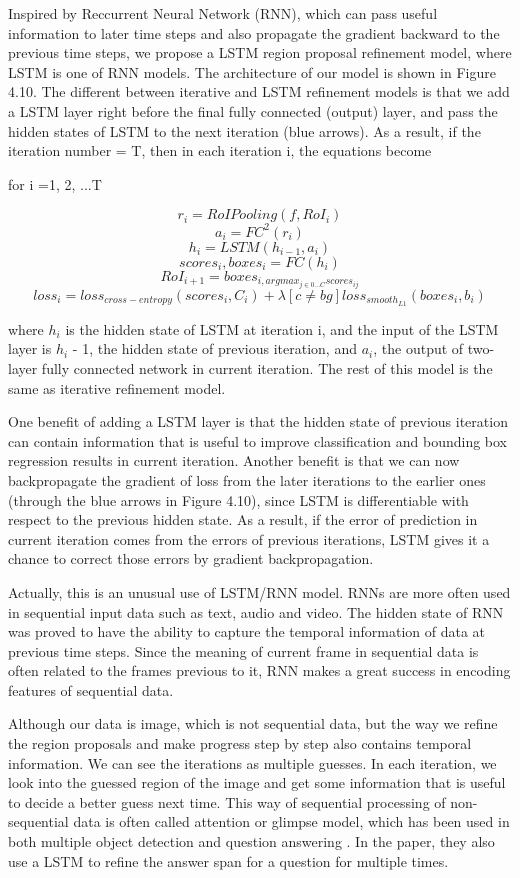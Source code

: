 Inspired by Reccurrent Neural Network (RNN), which
can pass useful information to later time steps and also
propagate the gradient backward to the previous time steps,
we propose a LSTM region proposal refinement model,
where LSTM is one of RNN models. The architecture of
our model is shown in Figure 4.10. The different between iterative and LSTM refinement models is that we add a LSTM
layer right before the final fully connected (output) layer,
and pass the hidden states of LSTM to the next iteration
(blue arrows). As a result, if the iteration number = T, then
in each iteration i, the equations become

for i =1, 2, ...T

\[  r_{i} = RoIPooling(f,RoI_{i})\]
\[a_{i} = FC^{2} (r_{i})\]
\[h_{i} = LSTM(h_{i-1} , a_{i})\]
\[scores_{i} , boxes_{i} = FC(h_{i})\]
\[RoI_{i+1} = boxes_{i , arg  max_{j \in 0... C}scores_{ij}} \]
\[loss_{i} = loss_{cross-entropy}(scores_{i} , C_{i}) + \lambda [c \neq bg ] loss_{smooth_{L1}} (boxes_{i} , b_{i})\]


where $h_{i}$ is the hidden state of LSTM at iteration i, and the input of the LSTM layer is $h_{i}$ - 1, the hidden state of previous iteration, and $a_{i}$, the output of two-layer fully connected network in current iteration. The rest of this model is the same as iterative refinement model.

One benefit of adding a LSTM layer is that the hidden
state of previous iteration can contain information that is
useful to improve classification and bounding box regression results in current iteration. Another benefit is that we
can now backpropagate the gradient of loss from the later
iterations to the earlier ones (through the blue arrows in Figure 4.10), since LSTM is differentiable with respect to the previous hidden state. As a result, if the error of prediction
in current iteration comes from the errors of previous iterations, LSTM gives it a chance to correct those errors by
gradient backpropagation.


Actually, this is an unusual use of LSTM/RNN model.
RNNs are more often used in sequential input data such as
text, audio and video. The hidden state of RNN was proved
to have the ability to capture the temporal information of
data at previous time steps. Since the meaning of current
frame in sequential data is often related to the frames previous to it, RNN makes a great success in encoding features
of sequential data.


Although our data is image, which is not sequential
data, but the way we refine the region proposals and make
progress step by step also contains temporal information.
We can see the iterations as multiple guesses. In each iteration, we look into the guessed region of the image and get
some information that is useful to decide a better guess next time. This way of sequential processing of non-sequential
data is often called attention or glimpse model, which has
been used in both multiple object detection and question
answering . In the paper, they also use a LSTM to
refine the answer span for a question for multiple times.

